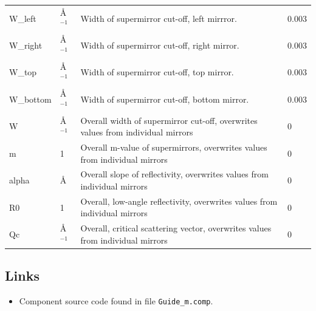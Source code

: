 \begin{longtable}{p{}p{}p{}p{}}
W\_left & \AA{}$^{-1}$ & Width of supermirror cut-off, left mirrror. & 0.003 \\
W\_right & \AA{}$^{-1}$ & Width of supermirror cut-off, right mirror. & 0.003 \\
W\_top & \AA{}$^{-1}$ & Width of supermirror cut-off, top mirror. & 0.003 \\
W\_bottom & \AA{}$^{-1}$ & Width of supermirror cut-off, bottom mirror. & 0.003 \\
W & \AA{}$^{-1}$ & Overall width of supermirror cut-off, overwrites values from individual mirrors & 0 \\
m & 1 & Overall m-value of supermirrors, overwrites values from individual mirrors & 0 \\
alpha & \AA{} & Overall slope of reflectivity, overwrites values from individual mirrors & 0 \\
R0 & 1 & Overall, low-angle reflectivity, overwrites values from individual mirrors & 0 \\
Qc & \AA{}$^{-1}$ & Overall, critical scattering vector, overwrites values from individual mirrors & 0 \\
\bottomrule
\end{longtable}

\subsection*{Links}
\begin{itemize}
  \item Component source code found in file \texttt{Guide\_m.comp}.
\end{itemize}
